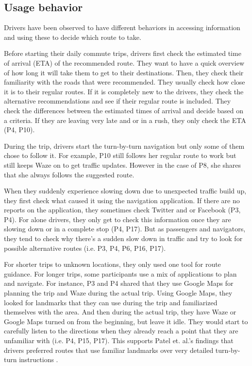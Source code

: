 \subsection{Usage behavior}
Drivers have been observed to have different behaviors in accessing information and using these to decide which route to take. 

Before starting their daily commute trips, drivers first check the estimated time of arrival (ETA) of the recommended route. They want to have a quick overview of how long it will take them to get to their destinations. Then, they check their familiarity with the roads that were recommended. They usually check how close it is to their regular routes. If it is completely new to the drivers, they check the alternative recommendations and see if their regular route is included. They check the differences between the estimated times of arrival and decide based on a criteria. If they are leaving very late and or in a rush, they only check the ETA (P4, P10). 

During the trip, drivers start the turn-by-turn navigation but only some of them chose to follow it. For example, P10 still follows her regular route to work but still keeps Waze on to get traffic updates. However in the case of P8, she shares that she always follows the suggested route.

When they suddenly experience slowing down due to unexpected traffic build up, they first check what caused it using the navigation application. If there are no reports on the application, they sometimes check Twitter and or Facebook (P3, P4). For alone drivers, they only get to check this information once they are slowing down or in a complete stop (P4, P17). But as passengers and navigators, they tend to check why there's a sudden slow down in traffic and try to look for possible alternative routes (i.e. P3, P4, P6, P16, P17).

For shorter trips to unknown locations, they only used one tool for route guidance. For longer trips, some participants use a mix of applications to plan and navigate. For instance, P3 and P4 shared that they use Google Maps for planning the trip and Waze during the actual trip. Using Google Maps, they looked for landmarks that they can use during the trip and familiarized themselves with the area. And then during the actual trip, they have Waze or Google Maps turned on from the beginning, but leave it idle. They would start to carefully listen to the directions when they already reach a point that they are unfamiliar with (i.e. P4, P15, P17). This supports Patel et. al.'s findings that drivers preferred routes that use familiar landmarks over very detailed turn-by-turn instructions \cite{Patel2006PersonalizingRoutes}. 

